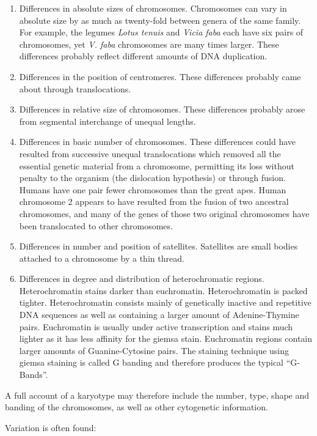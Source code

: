 \documentclass[]{book}
\providecommand{\tightlist}{%
  \setlength{\itemsep}{0pt}\setlength{\parskip}{0pt}}
\theoremstyle{definition}
\theoremstyle{definition}
\theoremstyle{definition}
\theoremstyle{remark}
\begin{document}
\begin{enumerate}
\def\labelenumi{\arabic{enumi}.}
\tightlist
\item
  Differences in absolute sizes of chromosomes. Chromosomes can vary in
  absolute size by as much as twenty-fold between genera of the same
  family. For example, the legumes \emph{Lotus tenuis} and \emph{Vicia
  faba} each have six pairs of chromosomes, yet \emph{V. faba}
  chromosomes are many times larger. These differences probably reflect
  different amounts of DNA duplication.
\item
  Differences in the position of centromeres. These differences probably
  came about through translocations.
\item
  Differences in relative size of chromosomes. These differences
  probably arose from segmental interchange of unequal lengths.
\item
  Differences in basic number of chromosomes. These differences could
  have resulted from successive unequal translocations which removed all
  the essential genetic material from a chromosome, permitting its loss
  without penalty to the organism (the dislocation hypothesis) or
  through fusion. Humans have one pair fewer chromosomes than the great
  apes. Human chromosome 2 appears to have resulted from the fusion of
  two ancestral chromosomes, and many of the genes of those two original
  chromosomes have been translocated to other chromosomes.
\item
  Differences in number and position of satellites. Satellites are small
  bodies attached to a chromosome by a thin thread.
\item
  Differences in degree and distribution of heterochromatic regions.
  Heterochromatin stains darker than euchromatin. Heterochromatin is
  packed tighter. Heterochromatin consists mainly of genetically
  inactive and repetitive DNA sequences as well as containing a larger
  amount of Adenine-Thymine pairs. Euchromatin is usually under active
  transcription and stains much lighter as it has less affinity for the
  giemsa stain. Euchromatin regions contain larger amounts of
  Guanine-Cytosine pairs. The staining technique using giemsa staining
  is called G banding and therefore produces the typical ``G-Bands''.
\end{enumerate}

A full account of a karyotype may therefore include the number, type,
shape and banding of the chromosomes, as well as other cytogenetic
information.

Variation is often found:
\end{document}

